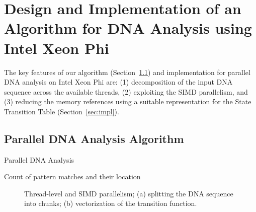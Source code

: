 \documentclass[conference]{IEEEtran}
\begin{document}
\section{Design and Implementation of an Algorithm for DNA Analysis using Intel Xeon Phi}
\label{our-algorithm}

The key features of our algorithm (Section~\ref{sec:alg1}) and implementation for parallel DNA analysis on Intel Xeon Phi are: (1) decomposition of the input DNA sequence across the available threads, (2) exploiting the SIMD parallelism, and (3) reducing the memory references using a suitable representation for the State Transition Table (Section~\ref{sec:impl}).

\subsection {Parallel DNA Analysis Algorithm}
\label{sec:alg1}


\begin{algorithm}[t]
	\caption{Parallel DNA Analysis}\label{alg:pac}
	\begin{algorithmic}[1]
		\Ensure Count of pattern matches and their location
		\State {}
		\State {}
		\State {} \label{alg:pac:split}
		\State {}
		\State {}
		\State {} \label{alg:pac:init_v}
\label{alg:pac:simd_loop} 
		\State {}
		\State {}  \label{alg:pac:load_next_node}
		\If {} \label{alg:pac:check_final}
		\EndIf
		\EndFor
		\EndFor
		\EndFor
		\EndProcedure
	\end{algorithmic}
\end{algorithm}

\begin{figure}[ht]
	\label{fig:paradna}
	\centering
	\hfil
	\caption {Thread-level and SIMD parallelism; (a) splitting the DNA sequence into chunks; (b) vectorization of the transition function.}
	\label{fig_sim}
\end{figure}
\end{document}
